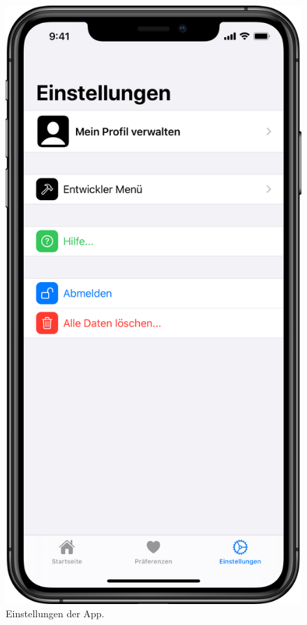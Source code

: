 \begin{minipage}{.45\textwidth}
	\begin{figure}[H]
		\centering
		\includegraphics[width=.68\textwidth]{./images/prototype/ios/settings.png}
		\caption{\label{fig:app:ios:settings}Einstellungen der App.}
	\end{figure}
\end{minipage}

